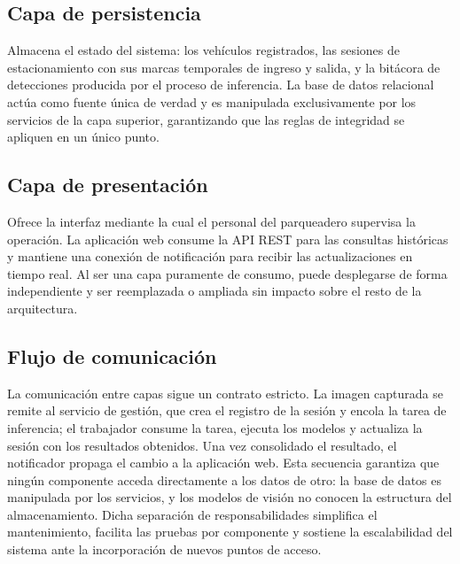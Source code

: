 \subsection{Capa de persistencia}

Almacena el estado del sistema: los vehículos registrados, las sesiones de
estacionamiento con sus marcas temporales de ingreso y salida, y la bitácora de
detecciones producida por el proceso de inferencia. La base de datos relacional
actúa como fuente única de verdad y es manipulada exclusivamente por los
servicios de la capa superior, garantizando que las reglas de integridad se
apliquen en un único punto.

\subsection{Capa de presentación}

Ofrece la interfaz mediante la cual el personal del parqueadero supervisa la
operación. La aplicación web consume la API REST para las consultas históricas y
mantiene una conexión de notificación para recibir las actualizaciones en
tiempo real. Al ser una capa puramente de consumo, puede desplegarse de forma
independiente y ser reemplazada o ampliada sin impacto sobre el resto de la
arquitectura.

\subsection{Flujo de comunicación}

La comunicación entre capas sigue un contrato estricto. La imagen capturada se
remite al servicio de gestión, que crea el registro de la sesión y encola la
tarea de inferencia; el trabajador consume la tarea, ejecuta los modelos y
actualiza la sesión con los resultados obtenidos. Una vez consolidado el
resultado, el notificador propaga el cambio a la aplicación web. Esta secuencia
garantiza que ningún componente acceda directamente a los datos de otro: la base
de datos es manipulada por los servicios, y los modelos de visión no conocen la
estructura del almacenamiento. Dicha separación de responsabilidades simplifica
el mantenimiento, facilita las pruebas por componente y sostiene la escalabilidad
del sistema ante la incorporación de nuevos puntos de acceso.

